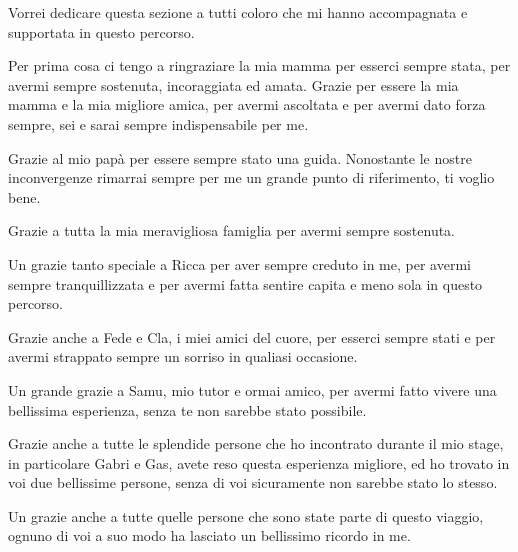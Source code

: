 \thispagestyle{plain}
Vorrei dedicare questa sezione a tutti coloro che mi hanno accompagnata e supportata in questo percorso. 


Per prima cosa ci tengo a ringraziare la mia mamma per esserci sempre stata, per avermi sempre sostenuta, incoraggiata ed amata. Grazie per essere la mia mamma e la mia migliore amica, per avermi ascoltata e per avermi dato forza sempre, sei e sarai sempre indispensabile per me.

Grazie al mio papà per essere sempre stato una guida. Nonostante le nostre inconvergenze rimarrai sempre per me un grande punto di riferimento, ti voglio bene.

Grazie a tutta la mia meravigliosa famiglia per avermi sempre sostenuta.

Un grazie tanto speciale a Ricca per aver sempre creduto in me, per avermi sempre tranquillizzata e per avermi fatta sentire capita e meno sola in questo percorso. 

Grazie anche a Fede e Cla, i miei amici del cuore, per esserci sempre stati e per avermi strappato sempre un sorriso in qualiasi occasione.

Un grande grazie a Samu, mio tutor e ormai amico, per avermi fatto vivere una bellissima esperienza, senza te non sarebbe stato possibile.

Grazie anche a tutte le splendide persone che ho incontrato durante il mio stage, in particolare Gabri e Gas, avete reso questa esperienza migliore, ed ho trovato in voi due bellissime persone, senza di voi sicuramente non sarebbe stato lo stesso.  

Un grazie anche a tutte quelle persone che sono state parte di questo viaggio, ognuno di voi a suo modo ha lasciato un bellissimo ricordo in me.

